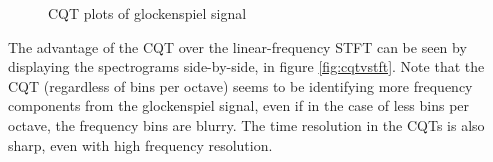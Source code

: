 \documentclass[letter,12pt]{article}
\begin{document}
\begin{figure}[ht]
	\vspace{0.1em}
	\hspace{0.35em}
	\hspace{0.35em}
	\caption{CQT plots of glockenspiel signal}
	\label{fig:glockcqts}
\end{figure}

\clearpage
\vfill

The advantage of the CQT over the linear-frequency STFT can be seen by displaying the spectrograms side-by-side, in figure \ref{fig:cqtvstft}. Note that the CQT (regardless of bins per octave) seems to be identifying more frequency components from the glockenspiel signal, even if in the case of less bins per octave, the frequency bins are blurry. The time resolution in the CQTs is also sharp, even with high frequency resolution.
\end{document}

